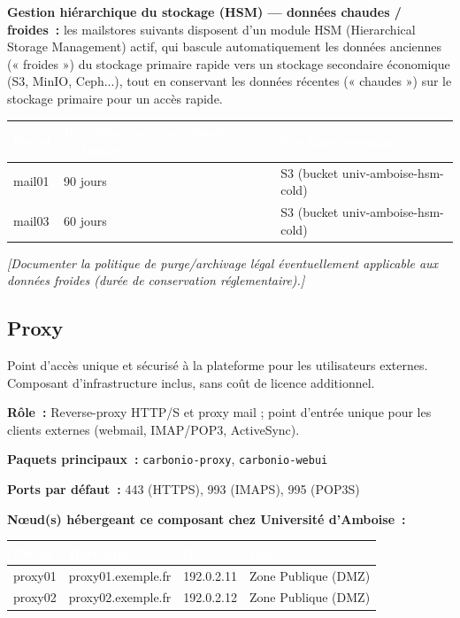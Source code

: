 \documentclass[11pt,a4paper]{report}
\newcommand{\placeholder}[1]{\textit{\textcolor{placeholdercol}{[#1]}}\par\vspace{4pt}}
\newcommand{\tblhead}[1]{\textcolor{white}{\textbf{#1}}}
\begin{document}
\textbf{Gestion hiérarchique du stockage (HSM) --- données chaudes / froides~:} les mailstores suivants disposent d'un module HSM (Hierarchical Storage Management) actif, qui bascule automatiquement les données anciennes (« froides ») du stockage primaire rapide vers un stockage secondaire économique (S3, MinIO, Ceph...), tout en conservant les données récentes (« chaudes ») sur le stockage primaire pour un accès rapide.
\begin{longtable}{|p{4cm}|p{4cm}|p{5cm}|}
\hline
\rowcolor{primary}\tblhead{Nœud} & \tblhead{Rétention données chaudes (primaire)} & \tblhead{Stockage secondaire} \\
\hline
\endhead
mail01 & 90 jours & S3 (bucket univ-\allowbreak{}amboise-\allowbreak{}hsm-\allowbreak{}cold) \\
\hline
mail03 & 60 jours & S3 (bucket univ-\allowbreak{}amboise-\allowbreak{}hsm-\allowbreak{}cold) \\
\hline
\end{longtable}
\placeholder{Documenter la politique de purge/archivage légal éventuellement applicable aux données froides (durée de conservation réglementaire).}


\subsection{Proxy}

Point d'accès unique et sécurisé à la plateforme pour les utilisateurs externes.\allowbreak{} Composant d'infrastructure inclus, sans coût de licence additionnel.\allowbreak{}

\textbf{Rôle~:} Reverse-\allowbreak{}proxy HTTP/S et proxy mail ; point d'entrée unique pour les clients externes (webmail, IMAP/POP3, ActiveSync).\allowbreak{}

\textbf{Paquets principaux~:} \texttt{carbonio-\allowbreak{}proxy}, \texttt{carbonio-\allowbreak{}webui}

\textbf{Ports par défaut~:} 443 (HTTPS), 993 (IMAPS), 995 (POP3S)

\textbf{Nœud(s) hébergeant ce composant chez Université d'Amboise~:}
\begin{longtable}{|p{3.2cm}|p{4.5cm}|p{3.2cm}|p{2.3cm}|}
\hline
\rowcolor{primary}\tblhead{Nœud} & \tblhead{Hostname} & \tblhead{IP} & \tblhead{Zone} \\
\hline
\endhead
proxy01 & proxy01.\allowbreak{}exemple.\allowbreak{}fr & 192.\allowbreak{}0.\allowbreak{}2.\allowbreak{}11 & Zone Publique (DMZ) \\
\hline
proxy02 & proxy02.\allowbreak{}exemple.\allowbreak{}fr & 192.\allowbreak{}0.\allowbreak{}2.\allowbreak{}12 & Zone Publique (DMZ) \\
\hline
\end{longtable}
\end{document}
